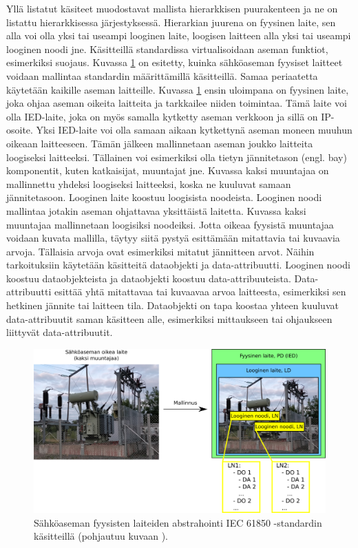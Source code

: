 Yllä listatut käsiteet muodostavat mallista hierarkkisen puurakenteen ja ne on listattu hierarkkisessa järjestyksessä. Hierarkian juurena on fyysinen laite, sen alla voi olla yksi tai useampi looginen laite, loogisen laitteen alla yksi tai useampi looginen noodi jne. Käsitteillä standardissa virtualisoidaan aseman funktiot, esimerkiksi suojaus. Kuvassa \ref{fig:substation-abstraction} on esitetty, kuinka sähköaseman fyysiset laitteet voidaan mallintaa standardin määrittämillä käsitteillä. Samaa periaatetta käytetään kaikille aseman laitteille. Kuvassa \ref{fig:substation-abstraction} ensin uloimpana on fyysinen laite, joka ohjaa aseman oikeita laitteita ja tarkkailee niiden toimintaa. Tämä laite voi olla IED-laite, joka on myös samalla kytketty aseman verkkoon ja sillä on IP-osoite. Yksi IED-laite voi olla samaan aikaan kytkettynä aseman moneen muuhun oikeaan laitteeseen. Tämän jälkeen mallinnetaan aseman joukko laitteita loogiseksi laitteeksi. Tällainen voi esimerkiksi olla tietyn jännitetason (engl. bay) komponentit, kuten katkaisijat, muuntajat jne. Kuvassa kaksi muuntajaa on mallinnettu yhdeksi loogiseksi laitteeksi, koska ne kuuluvat samaan jännitetasoon. Looginen laite koostuu loogisista noodeista. Looginen noodi mallintaa jotakin aseman ohjattavaa yksittäistä laitetta. Kuvassa kaksi muuntajaa mallinnetaan loogisiksi noodeiksi. Jotta oikeaa fyysistä muuntajaa voidaan kuvata mallilla, täytyy siitä pystyä esittämään mitattavia tai kuvaavia arvoja. Tällaisia arvoja ovat esimerkiksi mitatut jännitteen arvot. Näihin tarkoituksiin käytetään käsitteitä dataobjekti ja data-attribuutti. Looginen noodi koostuu dataobjekteista ja dataobjekti koostuu data-attribuuteista. Data-attribuutti esittää yhtä mitattavaa tai kuvaavaa arvoa laitteesta, esimerkiksi sen hetkinen jännite tai laitteen tila. Dataobjekti on tapa koostaa yhteen kuuluvat data-attribuutit saman käsitteen alle, esimerkiksi mittaukseen tai ohjaukseen liittyvät data-attribuutit. \mbox{\cite[s.~2]{Camachi2017}} \mbox{\cite[s.~24]{IEC61850-1}}

\begin{figure}[ht!]
	\includegraphics[width=1\textwidth]{pictures/substation-abstraction.png}
	\caption{Sähköaseman fyysisten laiteiden abstrahointi IEC 61850 -standardin käsitteillä (pohjautuu kuvaan \mbox{\cite[s.~17]{IEC61850-7-1}}).}
	\label{fig:substation-abstraction}
\end{figure}

